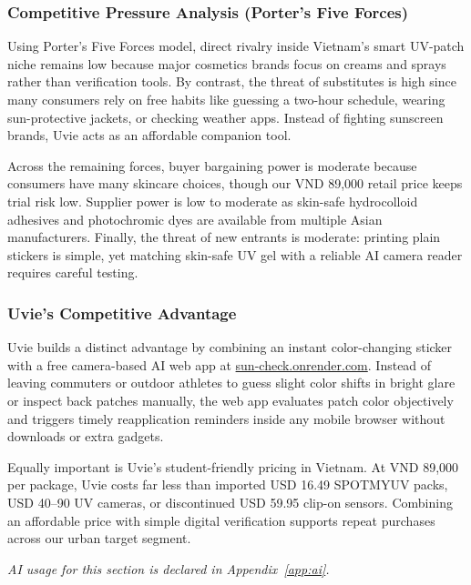 \subsubsection{Competitive Pressure Analysis (Porter's Five Forces)}
Using Porter's Five Forces model, direct rivalry inside Vietnam's smart UV-patch
niche remains low because major cosmetics brands focus on creams and sprays rather
than verification tools. By contrast, the threat of substitutes is high since many
consumers rely on free habits like guessing a two-hour schedule, wearing
sun-protective jackets, or checking weather apps. Instead of fighting sunscreen
brands, Uvie acts as an affordable companion tool.

Across the remaining forces, buyer bargaining power is moderate because consumers
have many skincare choices, though our VND 89,000 retail price keeps trial risk
low. Supplier power is low to moderate as skin-safe hydrocolloid adhesives and
photochromic dyes are available from multiple Asian manufacturers. Finally, the
threat of new entrants is moderate: printing plain stickers is simple, yet
matching skin-safe UV gel with a reliable AI camera reader requires careful
testing.

\subsubsection{Uvie's Competitive Advantage}
Uvie builds a distinct advantage by combining an instant color-changing sticker
with a free camera-based AI web app at
\href{https://sun-check.onrender.com}{sun-check.onrender.com}. Instead of leaving
commuters or outdoor athletes to guess slight color shifts in bright glare or
inspect back patches manually, the web app evaluates patch color objectively and
triggers timely reapplication reminders inside any mobile browser without
downloads or extra gadgets.

Equally important is Uvie's student-friendly pricing in Vietnam. At VND 89,000 per
package, Uvie costs far less than imported USD 16.49 SPOTMYUV packs, USD 40--90 UV
cameras, or discontinued USD 59.95 clip-on sensors. Combining an affordable price
with simple digital verification supports repeat purchases across our urban target
segment.

\medskip
\noindent\emph{AI usage for this section is declared in Appendix~\ref{app:ai}.}
